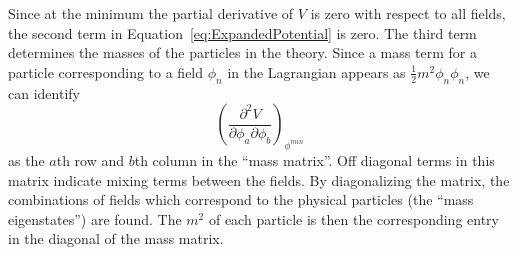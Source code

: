 Since at the minimum the partial derivative of $V$ is zero with respect to all
fields, the second term in Equation~\ref{eq:ExpandedPotential} is zero.  The
third term determines the masses of the particles in the theory.  Since a mass
term for a particle corresponding to a field $\phi_n$ in the Lagrangian appears
as $\frac{1}{2}m^2\phi_n\phi_n$, we can identify 
\begin{equation}
\left(\frac {\partial^2
V}{\partial \phi_a \partial \phi_b}\right)_{\phi^{min}}
\label{eq:MassMatrixTerms}
\end{equation}
as the $a$th row and $b$th column in the ``mass matrix''.  Off diagonal terms in
this matrix indicate mixing terms between the fields.  By diagonalizing the
matrix, the combinations of fields which correspond to the physical particles
(the ``mass eigenstates'') are found.  The $m^2$ of each particle is then the
corresponding entry in the diagonal of the mass matrix.

